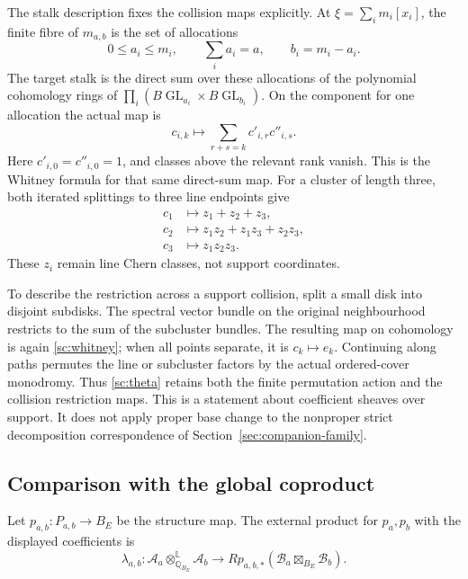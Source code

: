 The stalk description fixes the collision maps explicitly.
At $\xi=\sum_i m_i[x_i]$, the finite fibre of $m_{a,b}$ is the
set of allocations
\[
 0\leq a_i\leq m_i,\qquad \sum_i a_i=a,\qquad b_i=m_i-a_i.
\]
The target stalk is the direct sum over these allocations of the
polynomial cohomology rings of
$\prod_i(B\operatorname{GL}_{a_i}\times B\operatorname{GL}_{b_i})$.
On the component for one allocation the actual map is
\begin{equation}\label{sc:whitney}
 c_{i,k}\longmapsto\sum_{r+s=k}c'_{i,r}c''_{i,s}.
\end{equation}
Here $c'_{i,0}=c''_{i,0}=1$, and classes above the relevant rank
vanish. This is the Whitney formula for that same direct-sum map.
For a cluster of length three, both iterated splittings to three
line endpoints give
\[
 \begin{aligned}
 c_1&\longmapsto z_1+z_2+z_3,\\
 c_2&\longmapsto z_1z_2+z_1z_3+z_2z_3,\\
 c_3&\longmapsto z_1z_2z_3.
 \end{aligned}
\]
These $z_i$ remain line Chern classes, not support coordinates.

To describe the restriction across a support collision, split a
small disk into disjoint subdisks. The spectral vector bundle on
the original neighbourhood restricts to the sum of the subcluster
bundles. The resulting map on cohomology is again
\eqref{sc:whitney}; when all points separate, it is $c_k\mapsto e_k$.
Continuing along paths permutes the line or subcluster factors by
the actual ordered-cover monodromy. Thus \eqref{sc:theta} retains
both the finite permutation action and the collision restriction
maps. This is a statement about coefficient sheaves over support.
It does not apply proper base change to the nonproper strict
decomposition correspondence of Section~\ref{sec:companion-family}.

\subsection{Comparison with the global coproduct}

Let $p_{a,b}:P_{a,b}\to B_E$ be the structure map.
The external product for $p_a,p_b$ with the displayed coefficients is
\[
 \lambda_{a,b}:\mathcal A_a\otimes^{\mathbb L}_{\mathbb Q_{B_E}}
                  \mathcal A_b
       \longrightarrow
 Rp_{a,b,*}(\mathcal B_a\boxtimes_{B_E}\mathcal B_b).
\]

